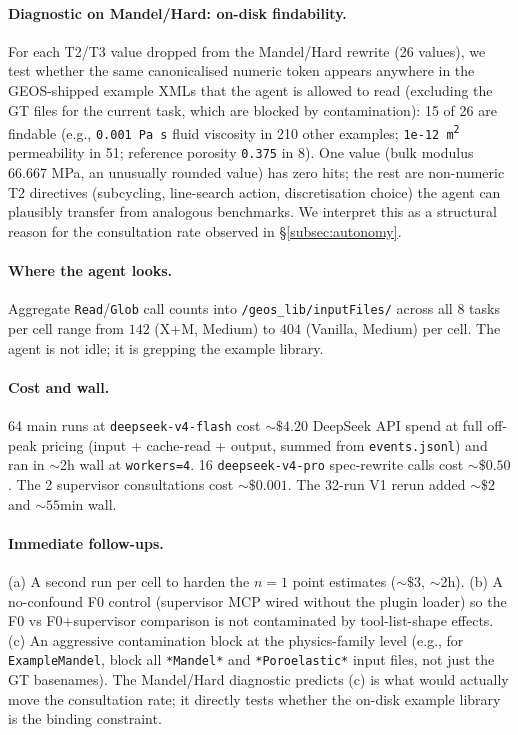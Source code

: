 \documentclass{article}
\begin{document}
\paragraph{Diagnostic on Mandel/Hard: on-disk findability.} For each T2/T3 value dropped from the Mandel/Hard rewrite (26 values), we test whether the same canonicalised numeric token appears anywhere in the GEOS-shipped example XMLs that the agent is allowed to read (excluding the GT files for the current task, which are blocked by contamination): 15 of 26 are findable (e.g., \texttt{0.001 Pa\,s} fluid viscosity in 210 other examples; \texttt{1e-12 m\textsuperscript{2}} permeability in 51; reference porosity \texttt{0.375} in 8). One value (bulk modulus 66.667 MPa, an unusually rounded value) has zero hits; the rest are non-numeric T2 directives (subcycling, line-search action, discretisation choice) the agent can plausibly transfer from analogous benchmarks. We interpret this as a structural reason for the consultation rate observed in \S\ref{subsec:autonomy}.

\paragraph{Where the agent looks.} Aggregate \texttt{Read}/\texttt{Glob} call counts into \texttt{/geos\_lib/inputFiles/} across all 8 tasks per cell range from $142$ (X+M, Medium) to $404$ (Vanilla, Medium) per cell. The agent is not idle; it is grepping the example library.

\paragraph{Cost and wall.} 64 main runs at \texttt{deepseek-v4-flash} cost ${\sim}\$4.20$ DeepSeek API spend at full off-peak pricing (input + cache-read + output, summed from \texttt{events.jsonl}) and ran in $\sim$2h wall at \texttt{workers=4}. 16 \texttt{deepseek-v4-pro} spec-rewrite calls cost ${\sim}\$0.50$. The 2 supervisor consultations cost ${\sim}\$0.001$. The 32-run V1 rerun added ${\sim}\$2$ and ${\sim}55$min wall.

\paragraph{Immediate follow-ups.} (a) A second run per cell to harden the $n=1$ point estimates ($\sim\$3$, $\sim$2h). (b) A no-confound F0 control (supervisor MCP wired without the plugin loader) so the F0 vs F0+supervisor comparison is not contaminated by tool-list-shape effects. (c) An aggressive contamination block at the physics-family level (e.g., for \texttt{ExampleMandel}, block all \texttt{*Mandel*} and \texttt{*Poroelastic*} input files, not just the GT basenames). The Mandel/Hard diagnostic predicts (c) is what would actually move the consultation rate; it directly tests whether the on-disk example library is the binding constraint.
\end{document}
